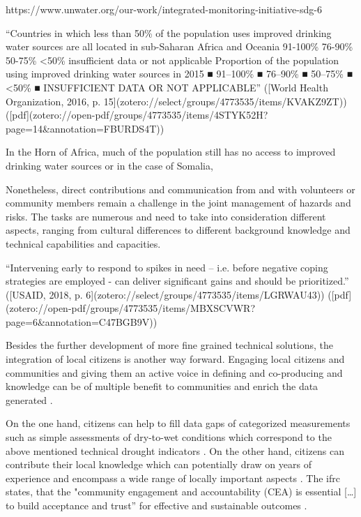
https://www.unwater.org/our-work/integrated-monitoring-initiative-sdg-6




“Countries in which less than 50\% of the population uses improved drinking water sources are all located in sub-Saharan Africa and Oceania 91-100\% 76-90\% 50-75\% <50\% insufficient data or not applicable Proportion of the population using improved drinking water sources in 2015 ■ 91–100\% ■ 76–90\% ■ 50–75\% ■ <50\% ■ INSUFFICIENT DATA OR NOT APPLICABLE” ([World Health Organization, 2016, p. 15](zotero://select/groups/4773535/items/KVAKZ9ZT)) ([pdf](zotero://open-pdf/groups/4773535/items/4STYK52H?page=14\&annotation=FBURDS4T))


In the Horn of Africa, much of the population still has no access to improved drinking water sources or in the case of Somalia,  


Nonetheless, direct contributions and communication from and with volunteers or community members remain a challenge in the joint management of hazards and risks. The tasks are numerous and need to take into consideration different aspects, ranging from cultural differences to different background knowledge and technical capabilities and capacities.

“Intervening early to respond to spikes in need – i.e. before negative coping strategies are employed - can deliver significant gains and should be prioritized.” ([USAID, 2018, p. 6](zotero://select/groups/4773535/items/LGRWAU43)) ([pdf](zotero://open-pdf/groups/4773535/items/MBXSCVWR?page=6&annotation=C47BGB9V))




Besides the further development of more fine grained technical solutions, the integration of local citizens is another way forward. Engaging local citizens and communities and giving them an active voice in defining and co-producing  and knowledge can be of multiple benefit to communities and enrich the data generated \autocite{somaliredcrescentsocietyFeasibilityStudyPotential2022, njambi-szlapkaIntegratingCommunityVoices}. 



On the one hand, citizens can help to fill data gaps of categorized measurements such as simple assessments of dry-to-wet conditions which correspond to the above mentioned technical drought indicators \autocite{lackstromBackyardHydroclimatologyCitizen2022}. On the other hand, citizens can contribute their local knowledge which can potentially draw on years of experience and encompass a wide range of locally important aspects \autocite{butteFrameworkWaterSecurity2022,koehlerCitizenParticipationCollaborative2008,njambi-szlapkaIntegratingCommunityVoices}. The \acrshort{ifrc} states, that the "community engagement and accountability (CEA) is essential […] to build acceptance and trust” for effective and sustainable outcomes \autocite{ifrcCommunityEngagementAccountability}.\newline



